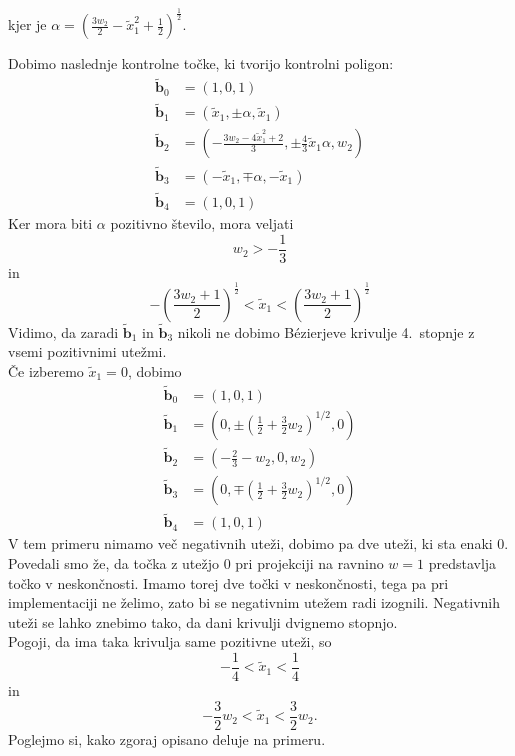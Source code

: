 \documentclass[a4paper,11pt]{article}
\theoremstyle{definition}
\theoremstyle{plain}
\begin{document}
kjer je $\alpha=(\frac{3w_2}{2}-\tilde{x}_1^2+\frac{1}{2})^{\frac{1}{2}}$.

\noindent Dobimo naslednje kontrolne točke, ki tvorijo kontrolni poligon:
\begin{align*}
\boldsymbol{\tilde{b}}_0 &= (1,0,1) \\
\boldsymbol{\tilde{b}}_1 &= (\tilde{x}_1,\pm\alpha,\tilde{x}_1) \\
\boldsymbol{\tilde{b}}_2 &= (-\frac{3w_2-4\tilde{x}_1^2+2}{3},\pm\frac{4}{3}\tilde{x}_1\alpha,w_2) \\
\boldsymbol{\tilde{b}}_3 &= (-\tilde{x}_1,\mp\alpha,-\tilde{x}_1) \\
\boldsymbol{\tilde{b}}_4 &= (1,0,1)
\end{align*}
\noindent
Ker mora biti $\alpha$ pozitivno število, mora veljati
$$w_2>-\frac{1}{3}$$
in
$$-\left(\frac{3w_2+1}{2}\right)^{\frac{1}{2}}<\tilde{x}_1<\left(\frac{3w_2+1}{2}\right)^{\frac{1}{2}}$$
Vidimo, da zaradi $\boldsymbol{\tilde{b}}_1$ in $\boldsymbol{\tilde{b}}_3$ nikoli ne dobimo B\'ezierjeve krivulje 4.~stopnje z vsemi pozitivnimi utežmi. \\
Če izberemo $\tilde{x}_1=0$, dobimo  
\begin{align*}
\boldsymbol{\tilde{b}}_0 &= (1,0,1) \\
\boldsymbol{\tilde{b}}_1 &= (0,\pm (\frac{1}{2}+\frac{3}{2}w_2)^{1/2},0) \\
\boldsymbol{\tilde{b}}_2 &= (-\frac{2}{3}-w_2,0,w_2) \\
\boldsymbol{\tilde{b}}_3 &= (0,\mp(\frac{1}{2}+\frac{3}{2}w_2)^{1/2},0) \\
\boldsymbol{\tilde{b}}_4 &= (1,0,1)
\end{align*}
V tem primeru nimamo več negativnih uteži, dobimo pa dve uteži, ki sta enaki $0$. Povedali smo že, da točka z utežjo $0$ pri projekciji na ravnino $w=1$ predstavlja točko v neskončnosti. 
Imamo torej dve točki v neskončnosti, tega pa pri implementaciji ne želimo, zato bi se negativnim utežem radi izognili.
Negativnih uteži se lahko znebimo tako, da dani krivulji dvignemo stopnjo. \\%
Pogoji, da ima taka krivulja same pozitivne uteži, so
$$-\frac{1}{4}<\tilde{x}_1<\frac{1}{4}$$
in
$$-\frac{3}{2}w_2<\tilde{x}_1<\frac{3}{2}w_2.$$
\noindent
Poglejmo si, kako zgoraj opisano deluje na primeru.
\end{document}
